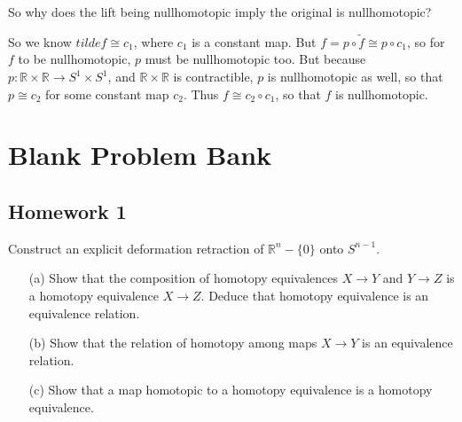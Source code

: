 \documentclass[12pt]{article}
\newcommand{\R}{\mathbb{R}}
\begin{document}
\begin{aq}
  So why does the lift being nullhomotopic imply the original is nullhomotopic?
\end{aq}
\begin{answer}
  So we know $tilde{f} \cong c_1$, where $c_1$ is a constant map. But $f = p \circ \tilde{f} \cong p \circ c_1$, so for 
  $f$ to be nullhomotopic, $p$ must be nullhomotopic too. But because $p:\R \times \R \to S^1 \times S^1$, and 
  $\R \times \R$ is contractible, $p$ is nullhomotopic as well, so that $p \cong c_2$ for some constant map $c_2$. 
  Thus $f \cong c_2 \circ c_1$, so that $f$ is nullhomotopic.
\end{answer}

\newpage

\section*{Blank Problem Bank}

\subsection*{Homework 1}

\begin{statement}[0.2]
    Construct an explicit deformation retraction of $\mathbb{R}^n - \{0\}$ onto $S^{n-1}$.
\end{statement}

\begin{statement}[0.3]
    \begin{itemize}
        \item[(a)] Show that the composition of homotopy equivalences $X \to Y$ and $Y \to Z$ is a homotopy equivalence $X \to Z$. Deduce that homotopy equivalence is an equivalence relation.

        \item[(b)] Show that the relation of homotopy among maps $X \to Y$ is an equivalence relation.

        \item[(c)] Show that a map homotopic to a homotopy equivalence is a homotopy equivalence.
    \end{itemize}
\end{statement}
\end{document}
